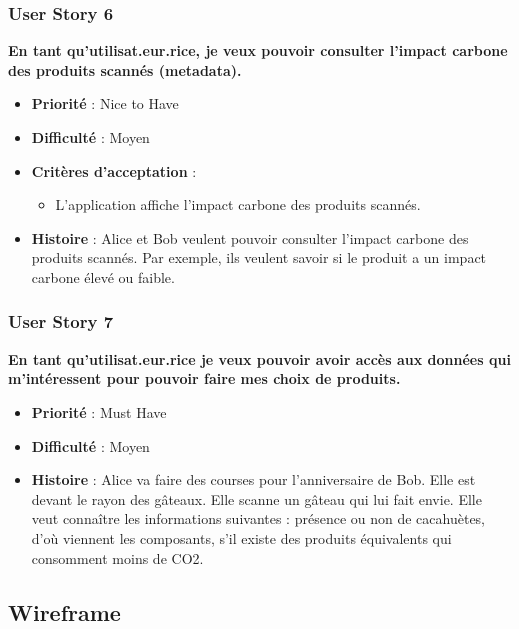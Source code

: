 \subsubsection{User Story 6}

\textbf{En tant qu'utilisat.eur.rice, je veux pouvoir consulter l'impact carbone des produits scannés (metadata).}

\begin{itemize}[noitemsep]
    \item \textbf{Priorité} : Nice to Have
    \item \textbf{Difficulté} : Moyen
    \item \textbf{Critères d'acceptation} :
          \begin{itemize}[noitemsep]
              \item L'application affiche l'impact carbone des produits scannés.
          \end{itemize}
    \item \textbf{Histoire} : Alice et Bob veulent pouvoir consulter l'impact carbone des produits scannés. Par exemple, ils veulent savoir si le produit a un impact carbone élevé ou faible.
\end{itemize}

\subsubsection{User Story 7}

\textbf{En tant qu'utilisat.eur.rice je veux pouvoir avoir accès aux données qui m'intéressent pour pouvoir faire mes choix de produits.}

\begin{itemize}[noitemsep]
    \item \textbf{Priorité} : Must Have
    \item \textbf{Difficulté} : Moyen
    \item \textbf{Histoire} : Alice va faire des courses pour l'anniversaire de Bob. Elle est devant le rayon des gâteaux. Elle scanne un gâteau qui lui fait envie. Elle veut connaître les informations suivantes : présence ou non de cacahuètes, d'où viennent les composants, s'il existe des produits équivalents qui consomment moins de CO2.
\end{itemize}

\subsection{Wireframe}

